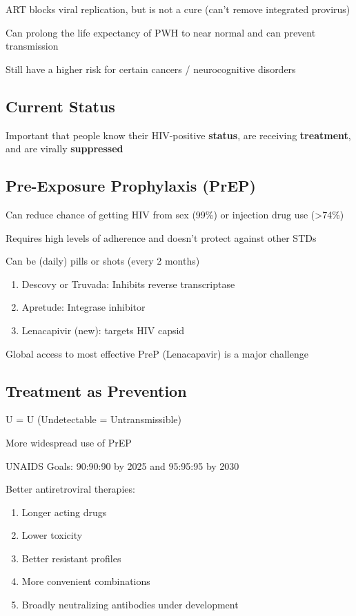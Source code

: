 \documentclass{notes}
\begin{document}
ART blocks viral replication, but is not a cure (can't remove integrated provirus)

\tab Can prolong the life expectancy of PWH to near normal and can prevent transmission

\tab \indicates Still have a higher risk for certain cancers / neurocognitive disorders

\subsection{Current Status}

Important that people know their HIV-positive \textbf{status}, are receiving \textbf{treatment}, and are virally \textbf{suppressed}

\subsection{Pre-Exposure Prophylaxis (PrEP)}

Can reduce chance of getting HIV from sex (99\%) or injection drug use (\textgreater74\%)

\tab Requires high levels of adherence and doesn't protect against other STDs

Can be (daily) pills or shots (every 2 months)

\begin{enumerate}
    \item Descovy or Truvada: Inhibits reverse transcriptase
    \item Apretude: Integrase inhibitor
    \item Lenacapivir (new): targets HIV capsid
\end{enumerate}

Global access to most effective PreP (Lenacapavir) is a major challenge

\subsection{Treatment as Prevention}

U = U (Undetectable = Untransmissible)

More widespread use of PrEP

UNAIDS Goals: 90:90:90 by 2025 and 95:95:95 by 2030

Better antiretroviral therapies:

\begin{enumerate}
    \item Longer acting drugs
    \item Lower toxicity
    \item Better resistant profiles
    \item More convenient combinations
    \item Broadly neutralizing antibodies under development
\end{enumerate}
\end{document}
